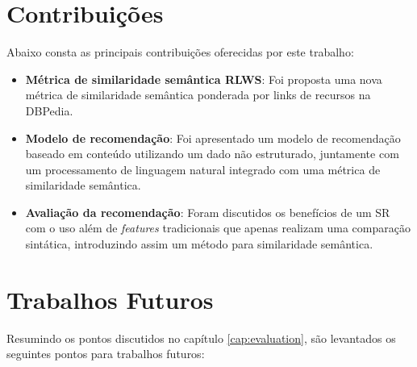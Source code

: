 \section{Contribuições}

Abaixo consta as principais contribuições oferecidas por este trabalho:

\begin{itemize}
	\item{\textbf{Métrica de similaridade semântica \ac{RLWS}}: Foi proposta uma nova métrica de similaridade semântica ponderada por links de recursos na DBPedia.}
	
	\item{\textbf{Modelo de recomendação}: Foi apresentado um modelo de recomendação baseado em conteúdo utilizando um dado não estruturado, juntamente com um processamento de linguagem natural integrado com uma métrica de similaridade semântica.}
	
	\item{\textbf{Avaliação da recomendação}: Foram discutidos os benefícios de um \ac{SR} com o uso além de \textit{features} tradicionais que apenas realizam uma comparação sintática, introduzindo assim um método para similaridade semântica.}
\end{itemize}

\section{Trabalhos Futuros}

Resumindo os pontos discutidos no capítulo \ref{cap:evaluation}, são levantados os seguintes pontos para trabalhos futuros:

